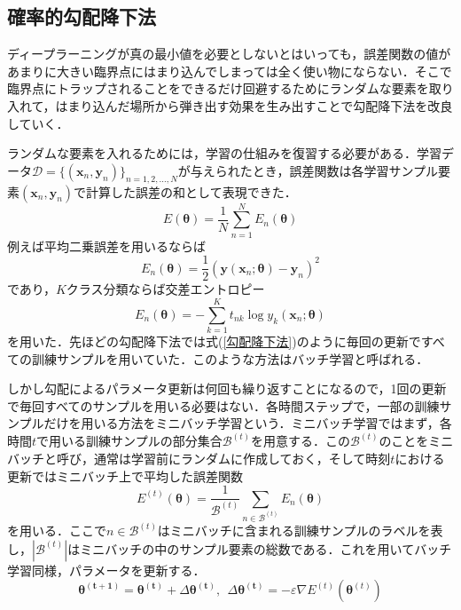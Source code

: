 \documentclass[a4paper,11pt]{jsreport}
\begin{document}
\subsection{確率的勾配降下法}
ディープラーニングが真の最小値を必要としないとはいっても，誤差関数の値があまりに大きい臨界点にはまり込んでしまっては全く使い物にならない．そこで臨界点にトラップされることをできるだけ回避するためにランダムな要素を取り入れて，はまり込んだ場所から弾き出す効果を生み出すことで勾配降下法を改良していく．\par
ランダムな要素を入れるためには，学習の仕組みを復習する必要がある．学習データ$\mathcal{D}=\{(\bm{x}_n,\bm{y}_n)\}_{n=1,2,\dots,N}$が与えられたとき，誤差関数は各学習サンプル要素$(\bm{x}_n,\bm{y}_n)$で計算した誤差の和として表現できた．
\begin{equation}
  E(\bm{\theta}) = \frac{1}{N}\sum_{n=1}^{N}E_n(\bm{\bm{\theta}}) \label{勾配降下法}
\end{equation}
例えば平均二乗誤差を用いるならば
\begin{equation}
  E_n(\bm{\bm{\theta}}) = \frac{1}{2}\left( \bm{y}(\bm{x}_n ; \bm{\theta}) - \bm{y}_n \right)^2
\end{equation}
であり，$K$クラス分類ならば交差エントロピー
\begin{equation}
  E_n(\bm{\bm{\theta}}) = - \sum_{k=1}^{K} t_{nk}\log{y_k(\bm{x}_n ; \bm{\theta})}
\end{equation}
を用いた．先ほどの勾配降下法では式(\ref{勾配降下法})のように毎回の更新ですべての訓練サンプルを用いていた．このような方法はバッチ学習と呼ばれる．\par
しかし勾配によるパラメータ更新は何回も繰り返すことになるので，1回の更新で毎回すべてのサンプルを用いる必要はない．各時間ステップで，一部の訓練サンプルだけを用いる方法をミニバッチ学習という．ミニバッチ学習ではまず，各時間$t$で用いる訓練サンプルの部分集合$\mathcal{B}^{(t)}$を用意する．この$\mathcal{B}^{(t)}$のことをミニバッチと呼び，通常は学習前にランダムに作成しておく，そして時刻$t$における更新ではミニバッチ上で平均した誤差関数
\begin{equation}
  E^{(t)}(\bm{\theta}) = \frac{1}{\mathcal{B}^{(t)}} \sum_{n\in \mathcal{B}^{(t)}} E_n(\bm{\theta})
\end{equation}
を用いる．ここで$n\in \mathcal{B}^{(t)}$はミニバッチに含まれる訓練サンプルのラベルを表し，$|\mathcal{B}^{(t)}|$はミニバッチの中のサンプル要素の総数である．これを用いてバッチ学習同様，パラメータを更新する．
\begin{equation}
  \bm{\theta^{(t+1)}} = \bm{\theta^{(t)}} + \Delta \bm{\theta^{(t)}} , \ \  \Delta \bm{\theta^{(t)}} = - \varepsilon \nabla E^{(t)}\left( \bm{\theta}^{(t)} \right)
\end{equation}
\end{document}
